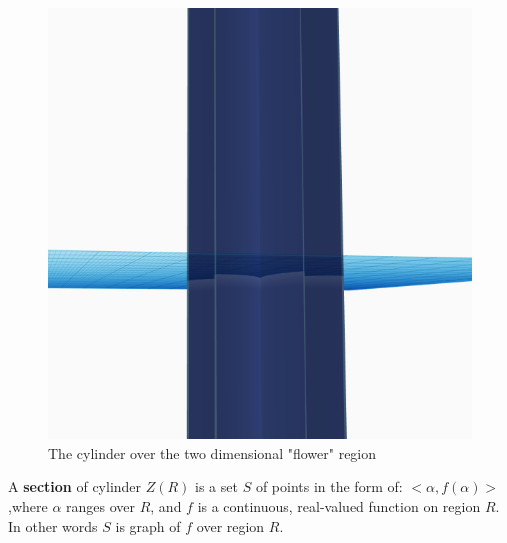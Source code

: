 \documentclass[
  digital, %
  twoside, %
  table,   %
  nolof,     %
  nolot,     %
]{fithesis3}
\begin{document}
\begin{figure}[H]
\begin{center}
\begin{minipage}{.4\textwidth}
      \includegraphics[width=\textwidth]{fithesis/images/flower3D.png} 
    \end{minipage}
  \end{center}
  \caption{The cylinder over the two dimensional "flower" region}
\end{figure}

\begin{definition}
A \textbf{section} of cylinder $Z(R)$ is a set $S$ of points in the form of: $<\alpha, f(\alpha)>$,where $\alpha$ ranges over $R$, and $f$ is a continuous, real-valued function on region $R$. In other words $S$ is graph of $f$ over region $R$.
\end{definition}
\end{document}
